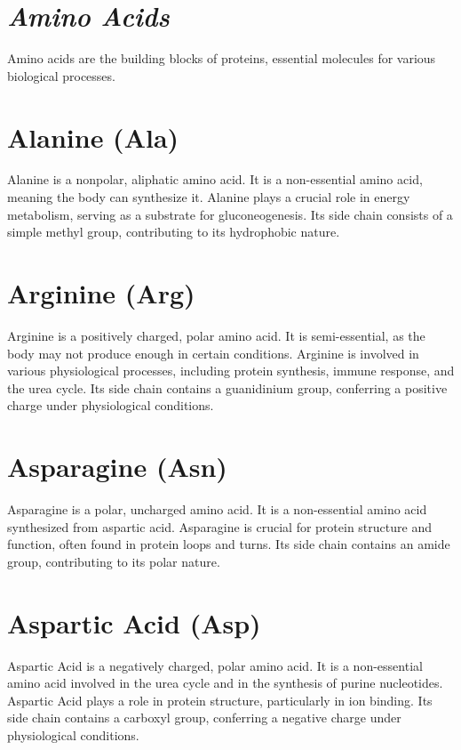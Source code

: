 \documentclass{article}
\begin{document}
\section *{\textit{Amino Acids}}
Amino acids are the building blocks of proteins, essential molecules for various biological processes. 

\section*{Alanine (Ala)}
Alanine is a nonpolar, aliphatic amino acid. It is a non-essential amino acid, meaning the body can synthesize it. Alanine plays a crucial role in energy metabolism, serving as a substrate for gluconeogenesis. Its side chain consists of a simple methyl group, contributing to its hydrophobic nature.
\begin{center}
\end{center}


\section*{Arginine (Arg)}
Arginine is a positively charged, polar amino acid. It is semi-essential, as the body may not produce enough in certain conditions. Arginine is involved in various physiological processes, including protein synthesis, immune response, and the urea cycle. Its side chain contains a guanidinium group, conferring a positive charge under physiological conditions.
\begin{center}
\end{center}

\section*{Asparagine (Asn)}
Asparagine is a polar, uncharged amino acid. It is a non-essential amino acid synthesized from aspartic acid. Asparagine is crucial for protein structure and function, often found in protein loops and turns. Its side chain contains an amide group, contributing to its polar nature.
\begin{center}
\end{center}

\section*{Aspartic Acid (Asp)}
Aspartic Acid is a negatively charged, polar amino acid. It is a non-essential amino acid involved in the urea cycle and in the synthesis of purine nucleotides. Aspartic Acid plays a role in protein structure, particularly in ion binding. Its side chain contains a carboxyl group, conferring a negative charge under physiological conditions.
\begin{center}
\end{center}
\end{document}
